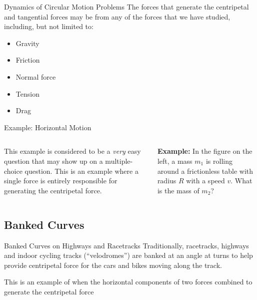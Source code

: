 \documentclass[12pt,compress,aspectratio=169]{beamer}
\begin{document}
\begin{frame}{Dynamics of Circular Motion Problems}
  The forces that generate the centripetal and tangential forces may be from
  any of the forces that we have studied, including, but not limited to:
  \begin{itemize}
  \item Gravity
  \item Friction
  \item Normal force
  \item Tension
  \item Drag
  \end{itemize}
\end{frame}



\begin{frame}{Example: Horizontal Motion}
  \begin{columns}
    
    This example is considered to be a \emph{very} easy question that may show
    up on a multiple-choice question. This is an example where a single force
    is entirely responsible for generating the centripetal force.
    
    \vspace{.1in}\textbf{Example:} In the figure on the left, a mass $m_1$ is
    rolling around a frictionless table with radius $R$ with a speed $v$. What
    is the mass of $m_2$?
  \end{columns}
\end{frame}



\subsection{Banked Curves}

\begin{frame}{Banked Curves on Highways and Racetracks}
  Traditionally, racetracks, highways and indoor cycling tracks
  (``velodromes'') are banked at an angle at turns to help provide centripetal
  force for the cars and bikes moving along the track.
  \begin{center}
  \end{center}
  This is an example of when the horizontal components of two forces combined to
  generate the centripetal force
\end{frame}
\end{document}
